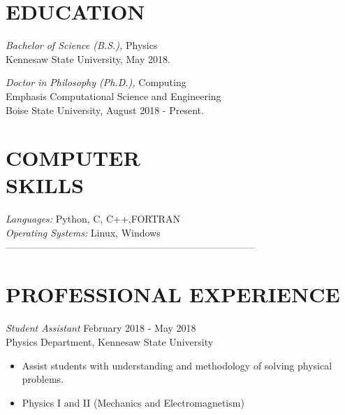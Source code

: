 \documentclass[margin, 10pt]{res} %
\begin{document}
\begin{resume}



\section{EDUCATION}

{\sl Bachelor of Science (B.S.),} Physics  \\
Kennesaw State University, May 2018.

{\sl Doctor in Philosophy (Ph.D.),} Computing \\
Emphasis Computational Science and Engineering  \\
Boise State University, August 2018 - Present.
 

\section{COMPUTER \\ SKILLS}

{\sl Languages:}
Python, C, C++,FORTRAN \\
{\sl Operating Systems:} Linux, Windows \\
 
-----------------------------------------------------------------------------
 
\section{PROFESSIONAL EXPERIENCE} 

{\sl Student Assistant} February 2018 - May 2018 \\
Physics Department, Kennesaw State University 
\begin{itemize}
\item Assist students with understanding and methodology of solving physical problems.
\item Physics I and II (Mechanics and Electromagnetism)
\end{itemize}
 

\end{resume}
\end{document}
